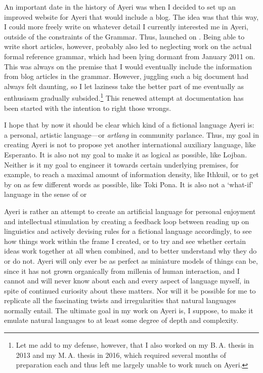 An important date in the history of Ayeri was when I decided to set up an
improved website for Ayeri that would include a blog. The idea was that this
way, I could more freely write on whatever detail I currently interested me in
Ayeri, outside of the constraints of the Grammar. Thus,  launched on . Being able to write short
articles, however, probably also led to neglecting work on the actual formal
reference grammar, which had been lying dormant from January 2011 on. This was
always on the premise that I would eventually include the information from blog
articles in the grammar. However, juggling such a big document had always felt
daunting, so I let laziness take the better part of me eventually as enthusiasm
gradually subsided.\footnote{Let me add to my defense, however, that I also
worked on my B.\,A. thesis in 2013 and my M.\,A. thesis in 2016, which required
several months of preparation each and thus left me largely unable to work much
on Ayeri.} This renewed attempt at documentation has been started with the
intention to right those wrongs.

I hope that by now it should be clear which kind of a fictional language Ayeri
is: a personal, artistic language---or \emph{artlang} in community parlance.
Thus, my goal in creating Ayeri is not to propose yet another
international auxiliary language, like Esperanto. It is also not my goal to
make it as logical as possible, like Lojban. Neither is it my goal to engineer
it towards certain underlying premises, for example, to reach a maximal amount
of information density, like Ithkuil, or to get by on as few different words as
possible, like Toki Pona. It is also not a `what-if' language in the sense of
 or 

Ayeri is rather an attempt to create an artificial language for personal
enjoyment and intellectual stimulation by creating a feedback loop between
reading up on linguistics and actively devising rules for a fictional language
accordingly, to see how things work within the frame I created, or to try and
see whether certain ideas work together at all when combined, and to better
understand why they do or do not. Ayeri will only ever be as perfect as
miniature models of things can be, since it has not grown organically from
millenia of human interaction, and I cannot and will never know about each and
every aspect of language myself, in spite of continued curiosity about these
matters. Nor will it be possible for me to replicate all the fascinating twists
and irregularities that natural languages normally entail. The ultimate
goal in my work on Ayeri is, I suppose, to make it emulate natural
languages to at least some degree of depth and complexity.

